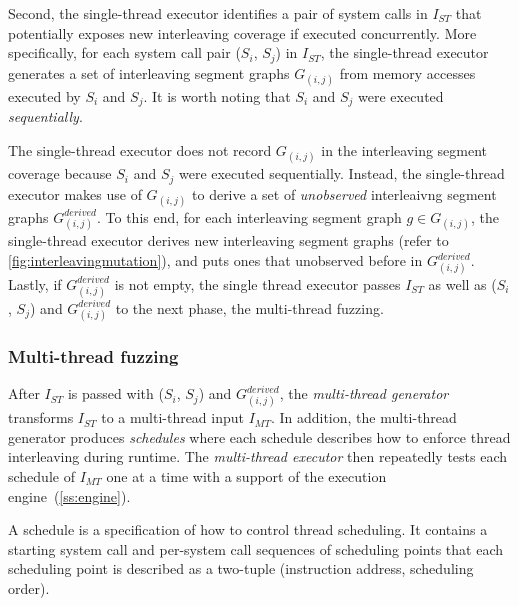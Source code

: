 Second, the single-thread executor identifies a pair of system calls
in $I_{ST}$ that potentially exposes new interleaving coverage if
executed concurrently.
%
More specifically, for each system call pair ($S_i$, $S_j$) in
$I_{ST}$, the single-thread executor generates a set of interleaving
segment graphs $G_{(i,j)}$ from memory accesses executed by $S_i$ and
$S_j$.
%
It is worth noting that $S_i$ and $S_j$ were executed
\textit{sequentially}.
%



The single-thread executor does not record $G_{(i,j)}$ in the
interleaving segment coverage because $S_i$ and $S_j$ were executed
sequentially.
%
Instead, the single-thread executor makes use of $G_{(i,j)}$ to derive
a set of \textit{unobserved} interleaivng segment graphs
$G^{derived}_{(i,j)}$.
%
To this end, for each interleaving segment graph $g \in G_{(i,j)}$,
the single-thread executor derives new interleaving segment graphs
(refer to \autoref{fig:interleavingmutation}), and puts ones that
unobserved before in $G^{derived}_{(i,j)}$.
%
Lastly, if $G^{derived}_{(i,j)}$ is not empty, the single thread
executor passes $I_{ST}$ as well as ($S_i$, $S_j$) and
$G^{derived}_{(i,j)}$ to the next phase, the multi-thread fuzzing.



\subsubsection{Multi-thread fuzzing}
\label{sss:multithreadfuzzing}
%
After $I_{ST}$ is passed with ($S_i$, $S_j$) and
$G^{derived}_{(i,j)}$, the \textit{multi-thread generator} transforms
$I_{ST}$ to a multi-thread input $I_{MT}$.
%
In addition, the multi-thread generator produces \textit{schedules}
where each schedule describes how to enforce thread interleaving
during runtime.
%
The \textit{multi-thread executor} then repeatedly tests each schedule
of $I_{MT}$ one at a time with a support of the execution
engine~(\autoref{ss:engine}).


%
A schedule is a specification of how to control thread scheduling.
%
It contains a starting system call and per-system call sequences of
scheduling points that each scheduling point is described as a
two-tuple (instruction address, scheduling order).

